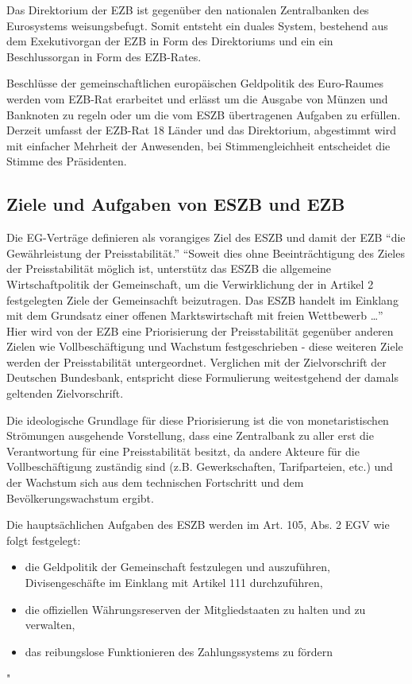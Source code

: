 \documentclass[
  onecolumn,
  a4paper,
  abstracton,
  parskip=half
  ,final
  ]{scrartcl}
\begin{document}
Das Direktorium der EZB ist gegen{\"u}ber den nationalen Zentralbanken des Eurosystems weisungsbefugt. Somit entsteht ein duales System, bestehend aus dem Exekutivorgan der EZB in Form des Direktoriums und ein ein Beschlussorgan in Form des EZB-Rates.
 
Beschl{\"u}sse der gemeinschaftlichen europ{\"a}ischen Geldpolitik des Euro-Raumes werden vom EZB-Rat erarbeitet und erl{\"a}sst um die Ausgabe von M{\"u}nzen und Banknoten zu regeln oder um die vom ESZB {\"u}bertragenen Aufgaben zu erf{\"u}llen. \citep[vgl.][S.553]{Basseler2010} 
Derzeit umfasst der EZB-Rat 18 L{\"a}nder und das Direktorium, abgestimmt wird mit einfacher Mehrheit der Anwesenden, bei Stimmengleichheit entscheidet die Stimme des Pr{\"a}sidenten.






\subsection{Ziele und Aufgaben von ESZB und EZB}
Die EG-Vertr{\"a}ge definieren als vorangiges Ziel des ESZB und damit der EZB "`die Gew{\"a}hrleistung der Preisstabilit{\"a}t."'
"`Soweit dies ohne Beeintr{\"a}chtigung des Zieles der Preisstabilit{\"a}t m{\"o}glich ist, unterst{\"u}tz das ESZB die allgemeine Wirtschaftpolitik der Gemeinschaft, um die Verwirklichung der in Artikel 2 festgelegten Ziele der Gemeinsachft beizutragen. Das ESZB handelt im Einklang mit dem Grundsatz einer offenen Marktswirtschaft mit freien Wettbewerb \ldots"'\citep[vgl.][S.554]{Basseler2010}
Hier wird von der EZB eine Priorisierung der Preisstabilit{\"a}t gegen{\"u}ber anderen Zielen wie Vollbesch{\"a}ftigung und Wachstum festgeschrieben - diese weiteren Ziele werden der Preisstabilit{\"a}t untergeordnet. Verglichen mit der Zielvorschrift der Deutschen Bundesbank, entspricht diese Formulierung weitestgehend der damals geltenden Zielvorschrift.\citep[vgl.][S.554]{Basseler2010}

Die ideologische Grundlage f{\"u}r diese Priorisierung ist die von monetaristischen Str{\"o}mungen ausgehende Vorstellung, dass eine Zentralbank zu aller erst die Verantwortung f{\"u}r eine Preisstabilit{\"a}t besitzt, da andere Akteure f{\"u}r die Vollbesch{\"a}ftigung zust{\"a}ndig sind (z.B. Gewerkschaften, Tarifparteien, etc.) und der Wachstum sich aus dem technischen Fortschritt und dem Bev{\"o}lkerungswachstum ergibt.

Die haupts{\"a}chlichen Aufgaben des ESZB werden im Art. 105, Abs. 2 EGV wie folgt festgelegt:
\begin{itemize}
  \item{die Geldpolitik der Gemeinschaft festzulegen und auszuf{\"u}hren, Divisengesch{\"a}fte im Einklang mit Artikel 111 durchzuf{\"u}hren,}
  \item{die offiziellen W{\"a}hrungsreserven der Mitgliedstaaten zu halten und zu verwalten,}
  \item{das reibungslose Funktionieren des Zahlungssystems zu f{\"o}rdern}
\end{itemize} \citep[vgl.][S.555]{Basseler2010} "
\end{document}
